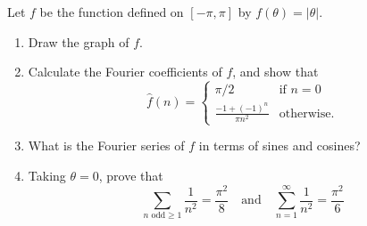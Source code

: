 \documentclass[12 pt, letterpaper]{hmcpset}
\begin{document}
\begin{problem}[S \& S \S 2.6 \#6.]
	Let $f$ be the function defined on $[-\pi, \pi]$ by $f(\theta) = \lvert \theta \rvert$.
	\begin{enumerate}
		\item Draw the graph of $f$.
		\item Calculate the Fourier coefficients of $f$, and show that
			\[
				\hat{f}(n) = \begin{cases}
					\pi / 2 & \text{if } n = 0 \\
					\frac{-1 + (-1)^{n}}{\pi n^{2}} & \text{otherwise}.
				\end{cases}
			\]
		\item What is the Fourier series of $f$ in terms of sines and cosines?
		\item Taking $\theta = 0$, prove that
			\[
				\sum_{n \text{ odd} \ge 1} \frac{1}{n^{2}} = \frac{\pi^{2}}{8} \quad \text{and} \quad \sum_{n = 1}^{\infty} \frac{1}{n^{2}} = \frac{\pi^{2}}{6}
			\]
	\end{enumerate}
\end{problem}
\end{document}
